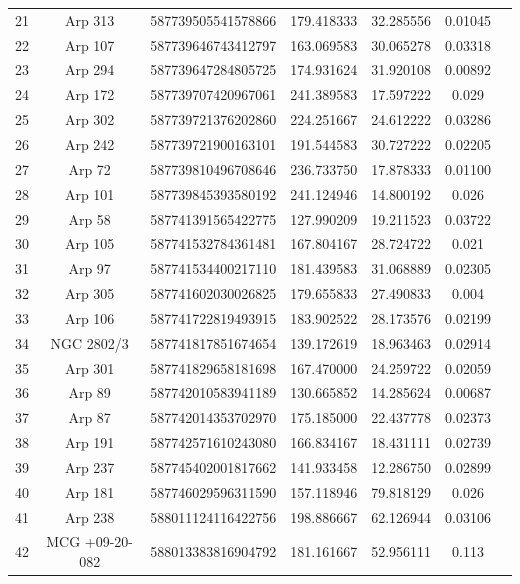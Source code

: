\begin{table}
\begin{tabular}{|c|c|c|c|c|c|c|}
         21 & Arp 313 & 587739505541578866 & 179.418333 & 32.285556 & 0.01045 \\
         22 & Arp 107 & 587739646743412797 & 163.069583 & 30.065278 & 0.03318 \\
         23 & Arp 294 & 587739647284805725 & 174.931624 & 31.920108 & 0.00892 \\
         24 & Arp 172 & 587739707420967061 & 241.389583 & 17.597222 & 0.029 \\
         25 & Arp 302 & 587739721376202860 & 224.251667 & 24.612222 & 0.03286 \\
         26 & Arp 242 & 587739721900163101 & 191.544583 & 30.727222 & 0.02205 \\
         27 & Arp 72 & 587739810496708646 & 236.733750 & 17.878333 & 0.01100 \\
         28 & Arp 101 & 587739845393580192 & 241.124946 & 14.800192 & 0.026 \\
         29 & Arp 58 & 587741391565422775 & 127.990209 & 19.211523 & 0.03722 \\
         30 & Arp 105 & 587741532784361481 & 167.804167 & 28.724722 & 0.021 \\
         31 & Arp 97 & 587741534400217110 & 181.439583 & 31.068889 & 0.02305 \\
         32 & Arp 305 & 587741602030026825 & 179.655833 & 27.490833 & 0.004 \\
         33 & Arp 106 & 587741722819493915 & 183.902522 & 28.173576 & 0.02199 \\
         34 & NGC 2802/3 & 587741817851674654 & 139.172619 & 18.963463 & 0.02914 \\
         35 & Arp 301 & 587741829658181698 & 167.470000 & 24.259722 & 0.02059 \\
         36 & Arp 89 & 587742010583941189 & 130.665852 & 14.285624 & 0.00687 \\
         37 & Arp 87 & 587742014353702970 & 175.185000 & 22.437778 & 0.02373 \\
         38 & Arp 191 & 587742571610243080 & 166.834167 & 18.431111 & 0.02739 \\
         39 & Arp 237 & 587745402001817662 & 141.933458 & 12.286750 & 0.02899 \\
         40 & Arp 181 & 587746029596311590 & 157.118946 & 79.818129 & 0.026 \\
         41 & Arp 238 & 588011124116422756 & 198.886667 & 62.126944 & 0.03106 \\
         42 & MCG +09-20-082 & 588013383816904792 & 181.161667 & 52.956111 & 0.113 \\

\end{tabular}
\end{table}
